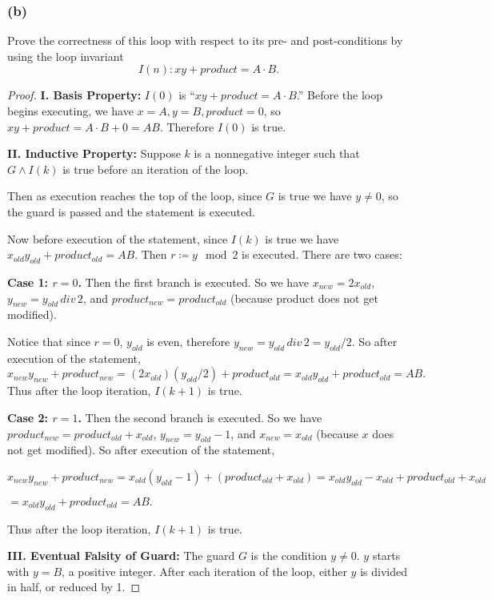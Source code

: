 \documentclass[14pt]{extarticle}
\begin{document}
\subsubsection{(b)}
Prove the correctness of this loop with respect to its pre- and post-conditions by using the loop invariant
\[
    I(n): xy + product = A \cdot B.
\]
\begin{proof}
    {\bf I. Basis Property:} $I(0)$ is ``$xy + product = A \cdot B$.'' Before the loop begins executing, we have
    $x = A, y = B, product = 0$, so $xy + product = A \cdot B + 0 = AB$. Therefore $I(0)$ is true.

        {\bf II. Inductive Property:} Suppose $k$ is a nonnegative integer such that $G \wedge I(k)$ is true before an
    iteration of the loop.

    Then as execution reaches the top of the loop, since $G$ is true we have $y \neq 0$,
    so the guard is passed and the statement is executed.

    Now before execution of the statement, since $I(k)$ is true we have $x_{old}y_{old} + product_{old} = AB$.
    Then $r \coloneqq y \mod 2$ is executed. There are two cases:

    {\bf Case 1: $r = 0$.} Then the first branch is executed. So we have $x_{new} = 2x_{old}$,
    $y_{new} = y_{old} \, div \, 2$, and $product_{new} = product_{old}$ (because product does not get modified).

    Notice that since $r = 0$, $y_{old}$ is even, therefore $y_{new} = y_{old} \, div \, 2 = y_{old} / 2$.
    So after execution of the statement,
    \[
        x_{new}y_{new} + product_{new} = (2x_{old})(y_{old} / 2) + product_{old} = x_{old}y_{old} + product_{old} = AB.
    \]
    Thus after the loop iteration, $I(k + 1)$ is true.

        {\bf Case 2: $r = 1$.} Then the second branch is executed. So we have $product_{new} = product_{old} + x_{old}$,
    $y_{new} = y_{old} - 1$, and $x_{new} = x_{old}$ (because $x$ does not get modified). So after execution of the statement,

    $x_{new}y_{new} + product_{new} = x_{old}(y_{old} - 1) + (product_{old} + x_{old}) = x_{old}y_{old} - x_{old} + product_{old} + x_{old}$

    $= x_{old}y_{old} + product_{old} = AB.$

    Thus after the loop iteration, $I(k + 1)$ is true.

        {\bf III. Eventual Falsity of Guard:} The guard $G$ is the condition $y \neq 0$. $y$ starts with $y = B$, a positive integer.
    After each iteration of the loop, either $y$ is divided in half, or reduced by 1.


\end{proof}
\end{document}
